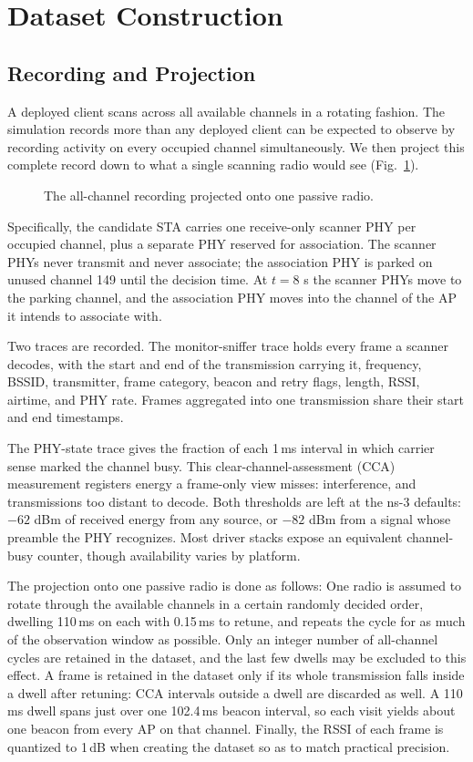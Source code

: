 \documentclass[conference]{IEEEtran}
\begin{document}
\section{Dataset Construction}
\label{sec:obs}

\subsection{Recording and Projection}

A deployed client scans across all available channels in a rotating fashion.
The simulation records more than any deployed client can be expected to observe
by recording activity on every occupied channel simultaneously. We then project 
this complete record down to what a single scanning radio would see
(Fig.~\ref{fig:scan}).

\begin{figure}[!ht]
  \centering
  
  \caption{The all-channel recording projected onto one passive radio.}
  \label{fig:scan}
\end{figure}

Specifically, the candidate STA carries one receive-only scanner PHY per
occupied channel, plus a separate PHY reserved for association. The scanner
PHYs never transmit and never associate; the association PHY is parked on
unused channel 149 until the decision time. At $t=8$ s the scanner PHYs move to
the parking channel, and the association PHY moves into the channel of the AP it 
intends to associate with.

Two traces are recorded. The monitor-sniffer trace holds every frame a scanner
decodes, with the start and end of the transmission carrying it, frequency,
BSSID, transmitter, frame category, beacon and retry flags, length, RSSI,
airtime, and PHY rate. Frames aggregated into one transmission share their start
and end timestamps. 

The PHY-state trace gives the fraction of each 1\,ms interval in which carrier sense
marked the channel busy. This clear-channel-assessment (CCA) measurement
registers energy a frame-only view misses: interference, and transmissions too
distant to decode. Both thresholds are left at the ns-3 defaults: $-62$ dBm of
received energy from any source, or $-82$ dBm from a signal whose preamble the
PHY recognizes. Most driver stacks expose an equivalent channel-busy counter, 
though availability varies by platform.

The projection onto one passive radio is done as follows: 
One radio is assumed to rotate through the available channels in a certain 
randomly decided order, dwelling 110\,ms on each with 0.15\,ms to retune, 
and repeats the cycle for as much of the observation window as possible. Only an integer number 
of all-channel cycles are retained in the dataset, and the last few dwells may be
excluded to this effect. A frame is retained in the dataset only if its whole transmission falls 
inside a dwell after retuning: CCA intervals outside a dwell are discarded as well. 
A 110\,ms dwell spans just over one 102.4\,ms beacon interval, so each visit yields about 
one beacon from every AP on that channel. Finally, the RSSI of each frame is quantized to 1\,dB when 
creating the dataset so as to match practical precision.
\end{document}
